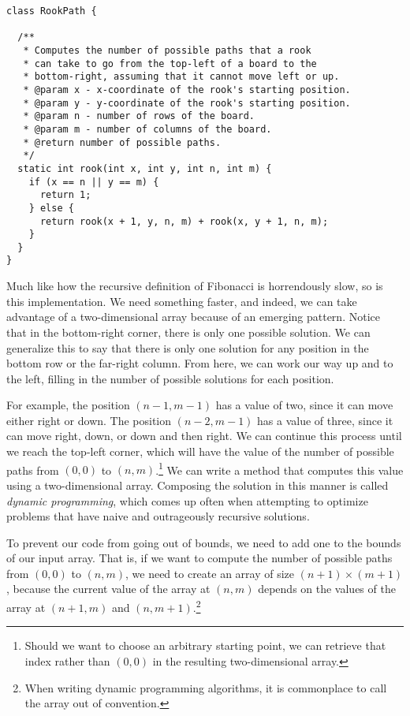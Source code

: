 \begin{lstlisting}[language=MyJava]
class RookPath {

  /**
   * Computes the number of possible paths that a rook 
   * can take to go from the top-left of a board to the 
   * bottom-right, assuming that it cannot move left or up.
   * @param x - x-coordinate of the rook's starting position.
   * @param y - y-coordinate of the rook's starting position.
   * @param n - number of rows of the board.
   * @param m - number of columns of the board.
   * @return number of possible paths.
   */
  static int rook(int x, int y, int n, int m) {
    if (x == n || y == m) { 
      return 1; 
    } else { 
      return rook(x + 1, y, n, m) + rook(x, y + 1, n, m); 
    }
  }
}
\end{lstlisting}

Much like how the recursive definition of Fibonacci is horrendously slow, so is this implementation. We need something faster, and indeed, we can take advantage of a two-dimensional array because of an emerging pattern. Notice that in the bottom-right corner, there is only one possible solution. We can generalize this to say that there is only one solution for any position in the bottom row or the far-right column. From here, we can work our way up and to the left, filling in the number of possible solutions for each position. 

For example, the position $(n - 1, m - 1)$ has a value of two, since it can move either right or down. The position $(n - 2, m - 1)$ has a value of three, since it can move right, down, or down and then right. We can continue this process until we reach the top-left corner, which will have the value of the number of possible paths from $(0, 0)$ to $(n, m)$.\footnote{Should we want to choose an arbitrary starting point, we can retrieve that index rather than $(0, 0)$ in the resulting two-dimensional array.} We can write a method that computes this value using a two-dimensional array. Composing the solution in this manner is called \emph{dynamic programming}, which comes up often when attempting to optimize problems that have naive and outrageously recursive solutions.

To prevent our code from going out of bounds, we need to add one to the bounds of our input array. That is, if we want to compute the number of possible paths from $(0, 0)$ to $(n, m)$, we need to create an array of size $(n + 1) \times (m + 1)$, because the current value of the array at $(n, m)$ depends on the values of the array at $(n + 1, m)$ and $(n, m + 1)$.\footnote{When writing dynamic programming algorithms, it is commonplace to call the array  out of convention.} 

